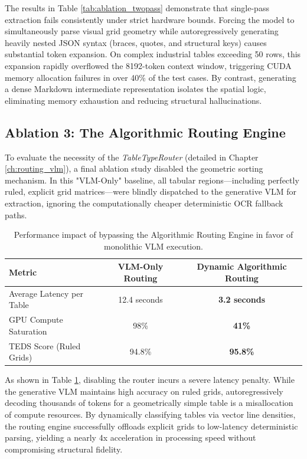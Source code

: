 The results in Table \ref{tab:ablation_twopass} demonstrate that single-pass extraction fails consistently under strict hardware bounds. Forcing the model to simultaneously parse visual grid geometry while autoregressively generating heavily nested JSON syntax (braces, quotes, and structural keys) causes substantial token expansion. On complex industrial tables exceeding 50 rows, this expansion rapidly overflowed the 8192-token context window, triggering CUDA memory allocation failures in over 40\% of the test cases. By contrast, generating a dense Markdown intermediate representation isolates the spatial logic, eliminating memory exhaustion and reducing structural hallucinations.

\subsection{Ablation 3: The Algorithmic Routing Engine}
\label{subsec:ablation_routing}

To evaluate the necessity of the \textit{TableTypeRouter} (detailed in Chapter \ref{ch:routing_vlm}), a final ablation study disabled the geometric sorting mechanism. In this "VLM-Only" baseline, all tabular regions---including perfectly ruled, explicit grid matrices---were blindly dispatched to the generative VLM for extraction, ignoring the computationally cheaper deterministic OCR fallback paths.

\begin{table}[htbp]
\centering
\begin{tabularx}{\textwidth}{Xcc}
\hline
\textbf{Metric} & \textbf{VLM-Only Routing} & \textbf{Dynamic Algorithmic Routing} \\
\hline
Average Latency per Table & 12.4 seconds & \textbf{3.2 seconds} \\
GPU Compute Saturation & 98\% & \textbf{41\%} \\
TEDS Score (Ruled Grids) & 94.8\% & \textbf{95.8\%} \\
\hline
\end{tabularx}
\caption{Performance impact of bypassing the Algorithmic Routing Engine in favor of monolithic VLM execution.}
\label{tab:ablation_routing}
\end{table}

As shown in Table \ref{tab:ablation_routing}, disabling the router incurs a severe latency penalty. While the generative VLM maintains high accuracy on ruled grids, autoregressively decoding thousands of tokens for a geometrically simple table is a misallocation of compute resources. By dynamically classifying tables via vector line densities, the routing engine successfully offloads explicit grids to low-latency deterministic parsing, yielding a nearly 4x acceleration in processing speed without compromising structural fidelity.


